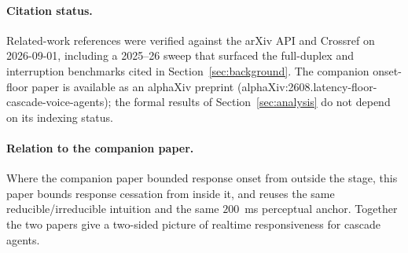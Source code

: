 \paragraph{Citation status.}
Related-work references were verified against the arXiv API and Crossref on 2026-09-01,
including a 2025--26 sweep that surfaced the full-duplex and interruption benchmarks cited
in Section~\ref{sec:background}.
The companion onset-floor paper is available as an alphaXiv preprint
(alphaXiv:2608.latency-floor-cascade-voice-agents); the formal results of
Section~\ref{sec:analysis} do not depend on its indexing status.

\paragraph{Relation to the companion paper.}
Where the companion paper \citep{latencyfloor2025} bounded response onset from outside the stage, this paper bounds
response cessation from inside it, and reuses the same reducible/irreducible intuition and the
same $200$~ms perceptual anchor.
Together the two papers give a two-sided picture of realtime responsiveness for cascade
agents.
